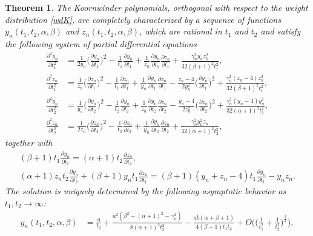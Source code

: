 \documentclass[10pt, reqno]{amsart}
\numberwithin{equation}{section}
\newtheorem{theorem}{Theorem}[section]
\numberwithin{equation}{section}
\begin{document}
\begin{theorem}\label{theorem 5.1} 
The Koornwinder polynomials, orthogonal with respect to the weight distribution \eqref{wdK}, are completely characterized by a sequence of functions $y_n(t_1,t_2,\alpha, \beta)$ and $z_n(t_1,t_2,\alpha,\beta)$, which are rational in $t_1$ and $t_2$ and satisfy the following system of partial differential equations
\begin{align}
\frac{\partial^2 y_n}{\partial t_1^2}&=\frac{1}{2y_n}\Big(\frac{\partial y_n}{\partial t_1}\Big)^2-\frac{1}{t_1}\frac{\partial y_n}{\partial t_1} +\frac{1}{z_n} \frac{\partial y_n}{\partial t_1} \frac{\partial z_n}{\partial t_1}
+ \frac{\gamma_n^2 y_nz_n^2}{32(\beta+1)^2t_1^2},\label{PKy1}\\
\frac{\partial^2 z_n}{\partial t_1^2}&=\frac{1}{z_n}\Big(\frac{\partial z_n}{\partial t_1}\Big)^2-\frac{1}{t_1}\frac{\partial z_n}{\partial t_1}+\frac{1}{y_n}\frac{\partial y_n}{\partial t_1} \frac{\partial z_n}{\partial t_1}
-\frac{z_n-4}{2y_n^2}\Big(\frac{\partial y_n}{\partial t_1}\Big)^2
+\frac{\gamma_n^2(z_n-4)z_n^2}{32(\beta+1)^2t_1^2}, \label{PKz1}\\
\frac{\partial^2 y_n}{\partial t_2^2}&=\frac{1}{y_n}\Big(\frac{\partial y_n}{\partial t_2}\Big)^2-\frac{1}{t_2}\frac{\partial y_n}{\partial t_2}+\frac{1}{z_n}\frac{\partial y_n}{\partial t_2} \frac{\partial z_n}{\partial t_2}
-\frac{y_n-4}{2z_n^2}\Big(\frac{\partial z_n}{\partial t_2}\Big)^2
+\frac{\gamma_n^2(y_n-4)y_n^2}{32(\alpha+1)^2t_2^2},\label{PKy2}\\
\frac{\partial^2 z_n}{\partial t_2^2}&=\frac{1}{2z_n}\Big(\frac{\partial z_n}{\partial t_2}\Big)^2-\frac{1}{t_2}\frac{\partial z_n}{\partial t_2} +\frac{1}{y_n} \frac{\partial y_n}{\partial t_2} \frac{\partial z_n}{\partial t_2}
+ \frac{\gamma_n^2 y_n^2z_n}{32(\alpha+1)^2t_2^2},\label{PKz2}
\end{align}
together with 
\begin{gather}
(\beta+1)t_1\frac{\partial y_n}{\partial t_1}=(\alpha+1)t_2\frac{\partial z_n}{\partial t_2},\label{PK1}\\
(\alpha+1)z_nt_2\frac{\partial y_n}{\partial t_2}+(\beta+1)y_nt_1\frac{\partial z_n}{\partial t_1}=(\beta+1)(y_n+z_n-4)t_1\frac{\partial y_n}{\partial t_1}-y_nz_n.\label{PK2}
\end{gather}
The solution is uniquely determined by the following asymptotic behavior as $t_1, t_2 \to \infty$:
\begin{align}
y_n(t_1,t_2,\alpha,\beta)&=\frac{a}{t_2}+\frac{a^2(\beta^2-(\alpha+1)^2-\gamma_n^2)}{8(\alpha+1)^2t_2^2}-\frac{ab(\alpha+\beta+1)}{4 (\beta+1)t_1t_2}+O\Big(\Big(\frac{1}{t_1^2} +\frac{1}{t_2^2}\Big)^\frac{3}{2}\Big),\label{aKy2}\\

\end{align}
\end{theorem}
\end{document}
